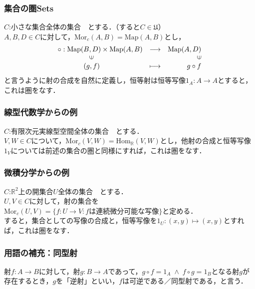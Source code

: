 \documentclass[uplatex, 12pt, a4paper, dvipdfmx]{jsarticle}
\begin{document}
\subsubsection{集合の圏\bf{Sets}}

$C$:小さな集合全体の集合　とする．（すると$C\in\mathfrak{U}$）\\
$A,B,D\in C$に対して，$\mathrm{Mor}_c(A,B)=\mathrm{Map}(A,B)$とし，$$\begin{array}{lcr}\circ : \mathrm{Map}(B,D)\times\mathrm{Map}(A,B)&\longrightarrow&\mathrm{Map}(A,D)\\ \hspace{16mm}\rotatebox{90}{$\in$} & & \rotatebox{90}{$\in$}\\ \hspace{13mm}(g,f) & \longmapsto & g\circ f \end{array}$$
と言うように射の合成を自然に定義し，恒等射は恒等写像$1_A:A\longrightarrow A$とすると，これは圏をなす．

\subsubsection{線型代数学からの例}

$C$:有限次元実線型空間全体の集合　とする．\\
$V,W\in C$について，$\mathrm{Mor}_c(V,W)=\mathrm{Hom}_\mathbb{R}(V,W)$とし，他射の合成と恒等写像$1_V$については前述の集合の圏と同様にすれば，これは圏をなす．

\subsubsection{微積分学からの例}

$C$:$\mathbb{R}^2$上の開集合$U$全体の集合　とする．\\
$U,V\in C$に対して，射の集合を$\mathrm{Mor}_c(U,V)=\{f:U\longrightarrow V: f\text{は連続微分可能な写像}\}$と定める．\\
すると，集合としての写像の合成と，恒等写像を$1_U:(x,y)\longmapsto (x,y)$とすれば，これは圏をなす．

\subsubsection{用語の補充：同型射}

\begin{shadebox}\begin{definition}[可逆，同型，逆射]
    射$f:A\longrightarrow B$に対して，射$g:B\longrightarrow A$であって，$g\circ f=1_A \; \wedge \; f\circ g=1_B$となる射$g$が存在するとき，$g$を「逆射」といい，$f$は可逆である／同型射である，と言う．
\end{definition}\end{shadebox}
\vspace{5mm}
\end{document}
